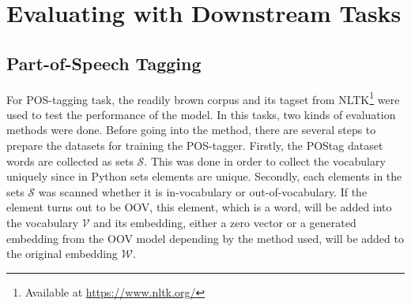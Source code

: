 
    
\section{Evaluating with Downstream Tasks}
    \subsection{Part-of-Speech Tagging}
        For POS-tagging task, the readily brown corpus and its tagset
        from NLTK\footnote{Available at \url{https://www.nltk.org/}}
        were used to test the performance of the model. In this tasks,
        two kinds of evaluation methods were done. Before going into
        the method, there are several steps to prepare the datasets
        for training the POS-tagger. Firstly, the POStag dataset words
        are collected as sets $\mathcal{S}$. This was done in order to
        collect the vocabulary uniquely since in Python sets elements
        are unique. Secondly, each elements in the sets $\mathcal{S}$
        was scanned whether it is in-vocabulary or out-of-vocabulary.
        If the element turns out to be OOV, this element, which is a
        word, will be added into the vocabulary $\mathcal{V}$ and its
        embedding, either a zero vector or a generated embedding from
        the OOV model depending by the method used, will be added to
        the original embedding $\mathcal{W}$. 
        
